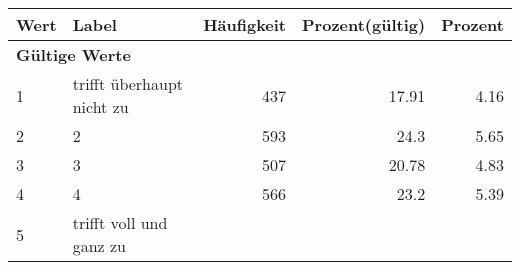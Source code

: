      \begin{longtable}{lXrrr}
     \toprule
     \textbf{Wert} & \textbf{Label} & \textbf{Häufigkeit} & \textbf{Prozent(gültig)} & \textbf{Prozent} \\
     \endhead
     \midrule
     \multicolumn{5}{l}{\textbf{Gültige Werte}}\\

     1 &
     \multicolumn{1}{X}{ trifft überhaupt nicht zu   } &


       \num{437} &
       \num[round-mode=places,round-precision=2]{17,91} &
         \num[round-mode=places,round-precision=2]{4,16} \\

     2 &
     \multicolumn{1}{X}{ 2   } &


       \num{593} &
       \num[round-mode=places,round-precision=2]{24,3} &
         \num[round-mode=places,round-precision=2]{5,65} \\

     3 &
     \multicolumn{1}{X}{ 3   } &


       \num{507} &
       \num[round-mode=places,round-precision=2]{20,78} &
         \num[round-mode=places,round-precision=2]{4,83} \\

     4 &
     \multicolumn{1}{X}{ 4   } &


       \num{566} &
       \num[round-mode=places,round-precision=2]{23,2} &
         \num[round-mode=places,round-precision=2]{5,39} \\

     5 &
     \multicolumn{1}{X}{ trifft voll und ganz zu   } &



\end{longtable}
